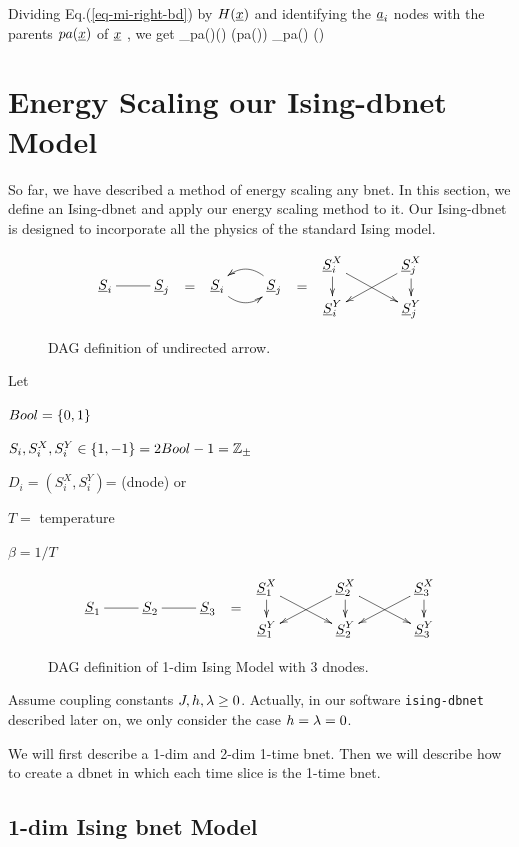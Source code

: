 Dividing Eq.(\ref{eq-mi-right-bd}) by $H(\rvx)$ 
and identifying the $\rva_i$ nodes with the parents $pa(\rvx)$
of $\rvx$ , we get
\beq
\max_{\rva\in pa(\rvx)}\eps(\rvx\larrow  \rva) \leq \eps(\rvx\larrow  pa(\rvx))
\leq \sum_{\rva\in pa(\rvx)} \eps(\rvx\larrow  \rva)
\eeq

\section{Energy Scaling our Ising-dbnet Model}
So far,
we have described
a method of energy scaling any bnet. 
In this section,
we define an Ising-dbnet
and apply our energy scaling method to it.
Our Ising-dbnet is designed
to incorporate
all the physics of the 
standard Ising model.

\begin{figure}[h!]
$$
\bcen
\xymatrix{
\rvS_i\ar@{-}[r]&\rvS_j
}
\ecen
=
\bcen
\xymatrix{
\rvS_i\ar@/_1pc/[r]
&\rvS_j\ar@/_1pc/[l]
}
\ecen
=
\bcen
\xymatrix@R=1pc@C=3pc{
\rvS_i^X\ar[dr]\ar[d]
&\rvS_j^X\ar[dl]\ar[d]
\\
\rvS_i^Y
&\rvS_j^Y
}
\ecen
$$
\caption{DAG definition of undirected arrow.}
\label{fig-def-undir-ar-dag}
\end{figure}

Let

$Bool=\{0,1\}$

 
$S_i, S_i^X, S_i^Y\in \{1, -1\} =2 Bool-1={\mathbb{Z}}_\pm$

$D_i=(S_i^X, S_i^Y)$=  (dnode)
or 

$T=$ temperature

$
\beta = 1/T
$

\begin{figure}[h!]
$$
\bcen
\xymatrix{
\rvS_1\ar@{-}[r]
&\rvS_2\ar@{-}[r]
&\rvS_3
}
\ecen
=
\bcen
\xymatrix@R=1pc@C=3pc{
\rvS_1^X\ar[dr]\ar[d]
&\rvS_2^X\ar[dl]\ar[dr]\ar[d]
&\rvS_3^X\ar[dl]\ar[d]
\\
\rvS_1^Y
&\rvS_2^Y
&\rvS_3^Y
}
\ecen
$$
\caption{DAG definition of 1-dim Ising Model
with 3 dnodes.}
\label{fig-def-1dim-ising}
\end{figure}

Assume coupling constants $J, h, \lambda\geq 0$.
Actually, in our software {\tt ising-dbnet}
described later on, we only consider
the case $h=\lambda=0$.

We will first describe
a 1-dim and 2-dim 1-time
bnet. Then we will
describe
how to create a dbnet
in which
each time slice is 
the 1-time bnet.

\subsection{1-dim Ising bnet Model}

